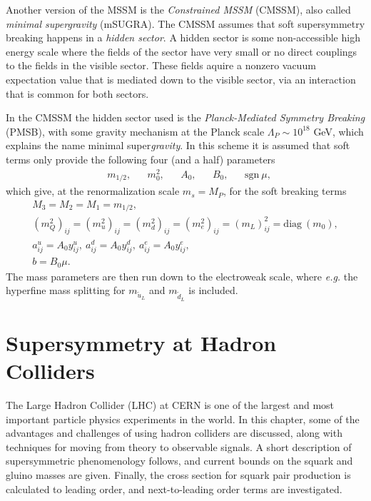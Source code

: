\documentclass[twoside,english]{uiofysmaster}
\makeatletter
\newenvironment{chapquote}[2][2em]
  {\setlength{\@tempdima}{#1}%
   \def\chapquote@author{#2}%
   \parshape 1 \@tempdima \dimexpr\textwidth-2\@tempdima\relax%
   \itshape}
  {\par\normalfont\hfill--\ \chapquote@author\hspace*{\@tempdima}\par\bigskip}
\makeatother
\begin{document}
{Another version of the MSSM is the \textit{Constrained MSSM} (CMSSM), also called \textit{minimal supergravity} (mSUGRA). The CMSSM assumes that soft supersymmetry breaking happens in a \textit{hidden sector}. A hidden sector is some non-accessible high energy scale where the fields of the sector have very small or no direct couplings to the fields in the visible sector. These fields aquire a nonzero vacuum expectation value that is mediated down to the visible sector, via an interaction that is common for both sectors. 

In the CMSSM the hidden sector used is the \textit{Planck-Mediated Symmetry Breaking} (PMSB), with some gravity mechanism at the Planck scale $\Lambda_P \sim 10^{18}$ GeV, which explains the name minimal super\textit{gravity}. In this scheme it is assumed that soft terms only provide the following four (and a half) parameters
\begin{align}
&m_{1/2}, &&m_0^2, &&A_0, &&B_0, &&\mathrm{sgn}~ \mu,
\end{align}
which give, at the renormalization scale $m_s=M_P$, for the soft breaking terms
\begin{align}
M_3 = M_2 = M_1 = m_{1/2},\\
(m_Q^2)_{ij} = (m_u^2)_{ij} = (m_d^2)_{ij} = (m_e^2)_{ij} = (m_L)^2_{ij} = \mathrm{diag}~ (m_0),\\
a^u_{ij} = A_0 y_{ij}^u, ~a^d_{ij} = A_0 y_{ij}^d,~a^e_{ij} = A_0 y^e_{ij},\\
b = B_0 \mu.
\end{align}
The mass parameters are then run down to the electroweak scale, where \textit{e.g.} the hyperfine mass splitting for $m_{\widetilde{u}_L}$ and $m_{\widetilde{d}_L}$ is included.





\chapter{Supersymmetry at Hadron Colliders}\label{Chapter:Supersymmetry at Hadron Colliders}



The Large Hadron Collider (LHC) at CERN is one of the largest and most important particle physics experiments in the world. In this chapter, some of the advantages and challenges of using hadron colliders are discussed, along with techniques for moving from theory to observable signals. A short description of supersymmetric phenomenology follows, and current bounds on the squark and gluino masses are given. Finally, the cross section for squark pair production is calculated to leading order, and next-to-leading order terms are investigated.

}
\end{document}
